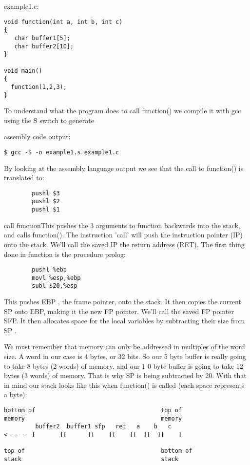 \documentclass[10pt]{article}
\begin{document}
example1.c: 

\begin{lstlisting}
void function(int a, int b, int c) 
{
   char buffer1[5];
   char buffer2[10];
}

void main() 
{
  function(1,2,3);
}
\end{lstlisting}

To understand what the program does to call function() we compile it with gcc using the  S switch to generate 

assembly code output: 

\begin{verbatim}
$ gcc -S -o example1.s example1.c
\end{verbatim}

By looking at the assembly language output we see that the call to function() is translated to:

\begin{lstlisting}
        pushl $3
        pushl $2
        pushl $1
\end{lstlisting}
call functionThis pushes the 3 arguments to function backwards into the stack, and calls function().
The instruction 'call' will push the instruction pointer (IP) onto the stack.
We'll call the saved IP the return address (RET).  The first thing done in function is the procedure prolog:

\begin{lstlisting}
        pushl %ebp
        movl %esp,%ebp
        subl $20,%esp
\end{lstlisting}

This pushes EBP , the frame pointer, onto the stack.  It then copies the current SP onto EBP, making it the new 
FP pointer.  We'll call the saved FP pointer SFP.  It then allocates space for the local variables by subtracting 
their size from SP .

We must remember that memory can only be addressed in multiples of the word size.   A word in our case is 4 
bytes, or 32 bits.  So our 5 byte buffer is really going to take 8 bytes (2 words) of memory, and our 1 0 byte 
buffer is going to take 12 bytes (3 words) of memory.  That is why SP is being subtracted by 20.  With that in 
mind our stack looks like this when function() is called  (each space represents a byte):

\begin{verbatim}
bottom of                                    top of
memory                                       memory
         buffer2  buffer1 sfp   ret   a    b   c
<------ [       ][      ][    ][    ][  ][  ][    ]

top of                                       bottom of
stack                                        stack
\end{verbatim}
\end{document}
